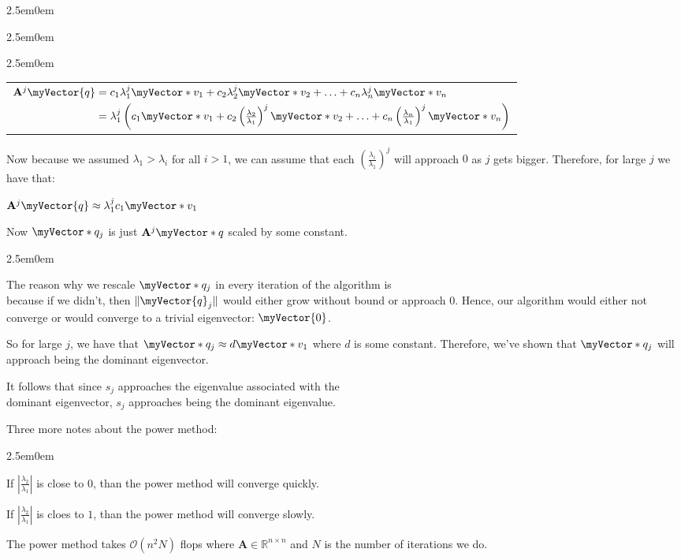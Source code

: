 \documentclass{book}
\newcommand{\teachComment}{
   \color{Orange}%
   \fontsize{12}{14}\selectfont%
}
\newenvironment{myIndent}{%
   \begin{adjustwidth}{2.5em}{0em}%
}{%
   \end{adjustwidth}%
}
\newcommand{\retTwo}{\hfill\bigbreak}
\newcommand{\mVec}[1]{\myVector{#1}}
\newcommand{\mVecAst}[1]{\myVector*{#1}}
\newcommand{\mMat}[1]{\mathbf{#1}}
\begin{document}
{\begin{myIndent}
{\begin{myIndent}
\begin{myIndent}
            \begin{center}
               \begin{tabular}{l}
                  $ \mMat{A}^j\mVec{q} = c_1\lambda_1^j\mVecAst{v}_1 + c_2\lambda_2^j\mVecAst{v}_2 + \ldots + c_n\lambda_n^j\mVecAst{v}_n$ \\
                  $\phantom{\mMat{A}^j\mVec{q}} = \lambda_1^j\left( c_1\mVecAst{v}_1 + c_2\left(\frac{\lambda_2}{\lambda_1}\right)^j\mVecAst{v}_2 + \ldots + c_n\left(\frac{\lambda_n}{\lambda_1}\right)^j\mVecAst{v}_n \right)$
               \end{tabular}
            \end{center}
            \retTwo
   
            Now because we assumed $\lambda_1 > \lambda_i$ for all $i > 1$, we can assume that each $\left(\frac{\lambda_i}{\lambda_1}\right)^j$ will approach $0$ as $j$ gets bigger. Therefore, for large $j$ we have that:
            
            {\center $\mMat{A}^j\mVec{q} \approx \lambda_1^{\vphantom{|}j}c_1\mVecAst{v}_1$ \retTwo\par}
            
            Now $\mVecAst{q}_j$ is just $\mMat{A}^j\mVecAst{q}$ scaled by some constant. 
            \begin{myIndent}
               The reason why we rescale $\mVecAst{q}_j$ in every iteration of the algorithm is\\ because if we didn't, then $\|\mVec{q}_j\|$ would either grow without bound or approach $0$. Hence, our algorithm would either not converge or would converge to a trivial eigenvector: $\mVec{0}$.
            \end{myIndent}

            \newpage

            So for large $j$, we have that $\mVecAst{q}_j \approx d\mVecAst{v}_1$ where $d$ is some constant. Therefore, we've shown that $\mVecAst{q}_j$ will approach being the dominant eigenvector. \retTwo

            It follows that since $s_j$ approaches the eigenvalue associated with the\\ dominant eigenvector, $s_j$ approaches being the dominant eigenvalue. \retTwo
         \end{myIndent}
      \end{myIndent}}

      \teachComment
      Three more notes about the power method:
      \begin{myIndent}
         If $\left|\frac{\lambda_2}{\lambda_1}\right|$ is close to $0$, than the power method will converge quickly.\retTwo
   
         If $\left|\frac{\lambda_2}{\lambda_1}\right|$ is cloes to $1$, than the power method will converge slowly.\retTwo
   
         The power method takes $\mathcal{O}(n^2N)$ flops where $\mMat{A} \in \mathbb{R}^{n\times n}$ and $N$ is the number of iterations we do. \retTwo
      \end{myIndent}
   \end{myIndent}}
\end{document}
